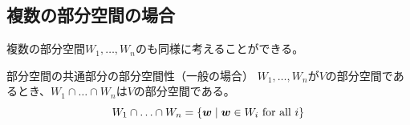 \documentclass[../../../topic_linear-algebra]{subfiles}
\begin{document}
\subsection{複数の部分空間の場合}

複数の部分空間$W_1, \ldots, W_n$のも同様に考えることができる。

\begin{theorem*}{部分空間の共通部分の部分空間性（一般の場合）}
  $W_1, \ldots, W_n$が$V$の部分空間であるとき、$W_1 \cap \ldots \cap W_n$は$V$の部分空間である。
  \begin{equation*}
    W_1 \cap \ldots \cap W_n = \{ \vb*{w} \mid \vb*{w} \in W_i \text{ for all } i \}
  \end{equation*}
\end{theorem*}
\end{document}
